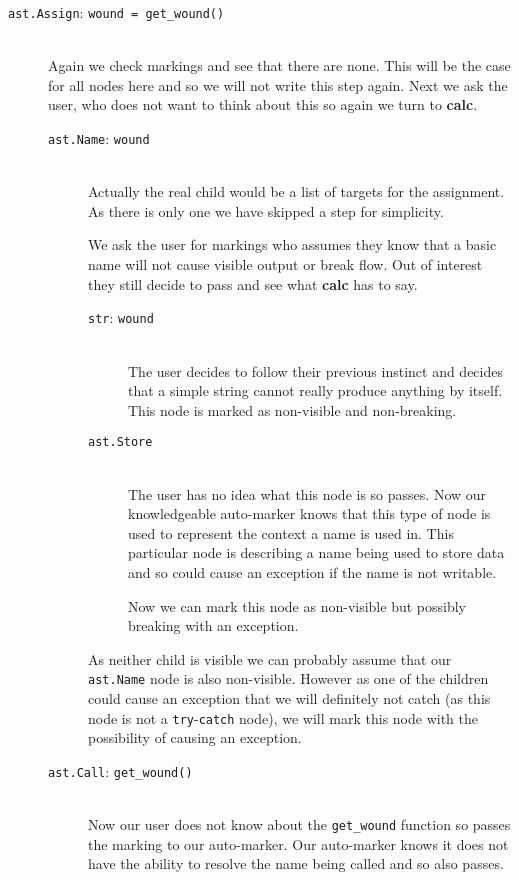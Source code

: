 \documentclass[twoside,a4paper]{report}
\begin{document}
\begin{description}
  \item[\texttt{ast.Assign}: \texttt{wound = get\_wound()}] \hfill \\
  Again we check markings and see that there are none. This will be the case for all nodes here and so we will not write this step again.
  Next we ask the user, who does not want to think about this so again we turn to \textbf{calc}.
  \begin{description}
    \item[\texttt{ast.Name}: \texttt{wound}] \hfill \\
    Actually the real child would be a list of targets for the assignment. As there is only one we have skipped a step for simplicity.
    
    We ask the user for markings who assumes they know that a basic name will not cause visible output or break flow. Out of interest they still
    decide to pass and see what \textbf{calc} has to say.
    \begin{description}
      \item[\texttt{str}: \texttt{wound}] \hfill \\
      The user decides to follow their previous instinct and decides that a simple string cannot really produce anything by itself. This node is
      marked as non-visible and non-breaking.

      \item[\texttt{ast.Store}] \hfill \\
      The user has no idea what this node is so passes. Now our knowledgeable auto-marker knows that this type of node is used to represent the context
      a name is used in. This particular node is describing a name being used to store data and so could cause an exception if the name is not writable.
      
      Now we can mark this node as non-visible but possibly breaking with an exception.
    \end{description}

    As neither child is visible we can probably assume that our \texttt{ast.Name} node is also non-visible. However as one of the children could cause an
    exception that we will definitely not catch (as this node is not a \texttt{try}-\texttt{catch} node), we will mark this node with the possibility
    of causing an exception.

    \item[\texttt{ast.Call}: \texttt{get\_wound()}] \hfill \\
    Now our user does not know about the \texttt{get\_wound} function so passes the marking to our auto-marker. Our auto-marker knows it does not have
    the ability to resolve the name being called and so also passes.


\end{description}
\end{description}
\end{document}
